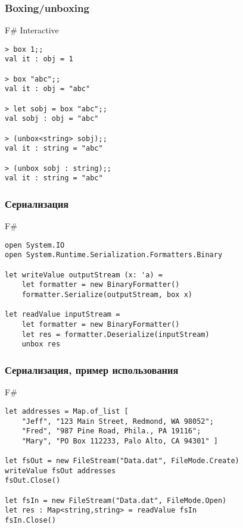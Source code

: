\documentclass[xetex,mathserif,serif]{beamer}
\begin{document}
	\begin{frame}[fragile]
		\frametitle{Boxing/unboxing}
		\begin{alertblock}{F\# Interactive}
			\begin{lstlisting}[keywordstyle=\color{black}]
> box 1;;
val it : obj = 1

> box "abc";;
val it : obj = "abc"

> let sobj = box "abc";;
val sobj : obj = "abc"

> (unbox<string> sobj);;
val it : string = "abc"

> (unbox sobj : string);;
val it : string = "abc"
\end{lstlisting}
\end{alertblock}
\end{frame}

	\begin{frame}[fragile]
		\frametitle{Сериализация}
		\begin{exampleblock}{F\#}
			\begin{lstlisting}
open System.IO
open System.Runtime.Serialization.Formatters.Binary

let writeValue outputStream (x: 'a) =
    let formatter = new BinaryFormatter()
    formatter.Serialize(outputStream, box x)

let readValue inputStream =
    let formatter = new BinaryFormatter()
    let res = formatter.Deserialize(inputStream)
    unbox res
\end{lstlisting}
\end{exampleblock}
\end{frame}

	\begin{frame}[fragile]
		\frametitle{Сериализация, пример использования}
		\begin{exampleblock}{F\#}
			\begin{lstlisting}
let addresses = Map.of_list [ 
    "Jeff", "123 Main Street, Redmond, WA 98052";
    "Fred", "987 Pine Road, Phila., PA 19116";
    "Mary", "PO Box 112233, Palo Alto, CA 94301" ]

let fsOut = new FileStream("Data.dat", FileMode.Create)
writeValue fsOut addresses
fsOut.Close()

let fsIn = new FileStream("Data.dat", FileMode.Open)
let res : Map<string,string> = readValue fsIn
fsIn.Close()
\end{lstlisting}
\end{exampleblock}
\end{frame}
\end{document}
